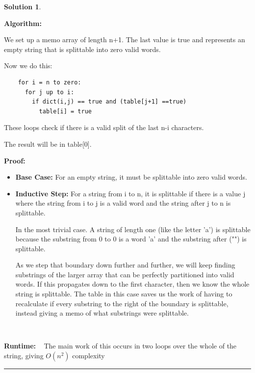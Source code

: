 \documentclass{article}
\theoremstyle{definition}
\def\fline{\rule{0.75\linewidth}{0.5pt}}
\newcommand{\finishline}{
  \begin{center}\fline
\end{center}}
\newtheorem*{solution*}{Solution}
\newenvironment{solution}{
\begin{solution*}}{{\finishline}
\end{solution*}}
\begin{document}
\begin{solution}
  \

  \textbf{Algorithm:}
  \
  \

  We set up a memo array of length n+1. The last value is true and represents an empty string that is splittable into zero valid words.

  Now we do this:

  \begin{verbatim}
    for i = n to zero:
      for j up to i:
        if dict(i,j) == true and (table[j+1] ==true)
          table[i] = true 
  \end{verbatim}

  These loops check if there is a valid split of the last n-i characters. 

  The result will be in table[0]. 
  \

  \textbf{Proof:}
  \

  \begin{itemize}
    \item \textbf{Base Case: } For an empty string, it must be splittable into zero valid words. 
    \item \textbf{Inductive Step: } For a string from i to n, it is splittable if there is a value j where the string from i to j is a valid word and the string after j to n is splittable.

    In the most trivial case. A string of length one (like the letter 'a') is splittable because the substring from 0 to 0 is a word 'a' and the substring after ("") is splittable.

    As we step that boundary down further and further, we will keep finding substrings of the larger array that can be perfectly partitioned into valid words. If this propagates down to the first character, then we know the whole string is splittable. The table in this case saves us the work of having to recalculate if every substring to the right of the boundary is splittable, instead giving a memo of what substrings were splittable.
  \end{itemize}
  \

  \textbf{Runtime:}
  \
  The main work of this occurs in two loops over the whole of the string, giving $O(n^2)$ complexity
\end{solution}
\end{document}
